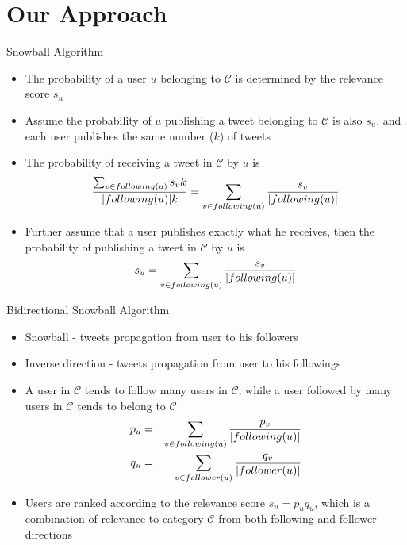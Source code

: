 \documentclass{beamer}
\begin{document}
\section{Our Approach}
\begin{frame}{Snowball Algorithm}
\begin{itemize}
\item The probability of a user $u$ belonging to $\mathcal{C}$ is determined by the relevance score $s_u$
\item Assume the probability of $u$ publishing a tweet belonging to $\mathcal{C}$ is also $s_u$, and each user publishes the same number ($k$) of tweets
\item The probability of receiving a tweet in $\mathcal{C}$ by $u$ is
$${\sum_{v \in following(u)} s_v k \over |following(u)|k} = \sum_{v \in following(u)}{s_v \over |following(u)|}$$
\item Further assume that a user publishes exactly what he receives, then the probability of publishing a tweet in $\mathcal{C}$ by $u$ is
$$s_u = \sum_{v \in following(u)} \frac{s_v}{|following(u)|}$$
\end{itemize}
\end{frame}

\begin{frame}{Bidirectional Snowball Algorithm}
\begin{itemize}
\item Snowball - tweets propagation from user to his \alert{followers}
\item Inverse direction - tweets propagation from user to his \alert{followings}
\item A user in $\mathcal{C}$ tends to follow many users in $\mathcal{C}$, while a user followed by many users in $\mathcal{C}$ tends to belong to $\mathcal{C}$
\begin{eqnarray}\label{eq:bidsnowball}
p_u & = & \sum_{v \in following(u)} \frac{p_v}{|following(u)|} \nonumber \\
q_u & = & \sum_{v \in follower(u)} \frac{q_v}{|follower(u)|} \nonumber
\end{eqnarray}
\item Users are ranked according to the relevance score $s_u = p_u q_u$, which is a combination of relevance to category $\mathcal{C}$ from both following and follower directions
\end{itemize}
\end{frame}
\end{document}
